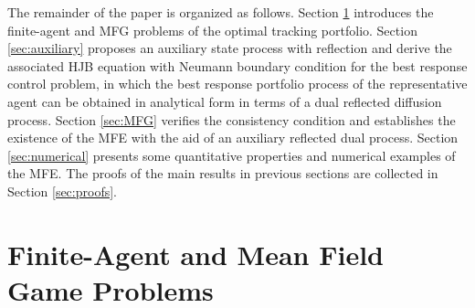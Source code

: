 \documentclass[11pt,times,letter]{article}
\newcommand{\Ex}{ \mathbb{E} }
\numberwithin{equation}{section}
\begin{document}
{\footnotesize
\begin{center}
\end{center}}

The remainder of the paper is organized as follows. Section \ref{sec:model} introduces the finite-agent and MFG problems of the optimal tracking portfolio. Section \ref{sec:auxiliary} proposes an auxiliary state process with reflection and derive the associated HJB equation with Neumann boundary condition for the best response control problem, in which the best response portfolio process of the representative agent can be obtained in analytical form in terms of a dual reflected diffusion process. Section \ref{sec:MFG}  verifies the consistency condition and establishes the existence of the MFE with the aid of an auxiliary reflected dual process. Section \ref{sec:numerical} presents some quantitative properties and numerical examples of the MFE. The proofs of the main results in previous sections are collected in Section \ref{sec:proofs}.

\section{Finite-Agent and Mean Field Game Problems}\label{sec:model}
\end{document}
